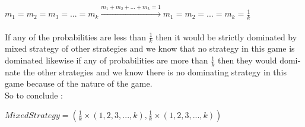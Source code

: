 \begin{latin}
           $m_1 = m_2 = m_3 = ... = m_k \xrightarrow{m_1+m_2+...+m_k=1} m_1 = m_2 = ... = m_k = \frac{1}{k}$\\ \\
           If any of the probabilities are less than $\frac{1}{k}$ then it would be strictly dominated by mixed strategy of other strategies and we know that no strategy in this 
           game is dominated likewise if any of probabilities are more than $\frac{1}{k}$ then they would dominate the other strategies and we know there is no dominating strategy in this game 
           because of the nature of the game.\\
           So to conclude : \begin{center}
            $Mixed Strategy = (\frac{1}{k} \times (1,2,3,...,k),\frac{1}{k} \times (1,2,3,...,k))$
           \end{center}
\end{latin}